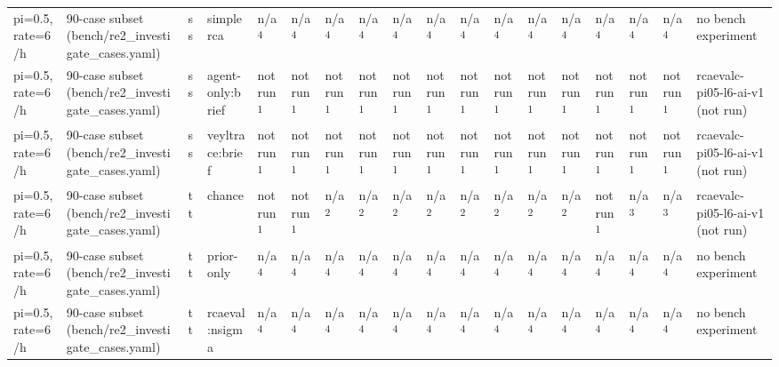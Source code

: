\begin{table}[t]
\begin{tabular}{llllllllllllllllll}
pi=0.5, rate=6/h & 90-case subset (bench/re2\_investigate\_cases.yaml) & ss & simplerca & n/a\textsuperscript{4} & n/a\textsuperscript{4} & n/a\textsuperscript{4} & n/a\textsuperscript{4} & n/a\textsuperscript{4} & n/a\textsuperscript{4} & n/a\textsuperscript{4} & n/a\textsuperscript{4} & n/a\textsuperscript{4} & n/a\textsuperscript{4} & n/a\textsuperscript{4} & n/a\textsuperscript{4} & n/a\textsuperscript{4} & no bench experiment \\
pi=0.5, rate=6/h & 90-case subset (bench/re2\_investigate\_cases.yaml) & ss & agent-only:brief & not run\textsuperscript{1} & not run\textsuperscript{1} & not run\textsuperscript{1} & not run\textsuperscript{1} & not run\textsuperscript{1} & not run\textsuperscript{1} & not run\textsuperscript{1} & not run\textsuperscript{1} & not run\textsuperscript{1} & not run\textsuperscript{1} & not run\textsuperscript{1} & not run\textsuperscript{1} & not run\textsuperscript{1} & rcaevalc-pi05-l6-ai-v1 (not run) \\
pi=0.5, rate=6/h & 90-case subset (bench/re2\_investigate\_cases.yaml) & ss & veyltrace:brief & not run\textsuperscript{1} & not run\textsuperscript{1} & not run\textsuperscript{1} & not run\textsuperscript{1} & not run\textsuperscript{1} & not run\textsuperscript{1} & not run\textsuperscript{1} & not run\textsuperscript{1} & not run\textsuperscript{1} & not run\textsuperscript{1} & not run\textsuperscript{1} & not run\textsuperscript{1} & not run\textsuperscript{1} & rcaevalc-pi05-l6-ai-v1 (not run) \\
pi=0.5, rate=6/h & 90-case subset (bench/re2\_investigate\_cases.yaml) & tt & chance & not run\textsuperscript{1} & not run\textsuperscript{1} & n/a\textsuperscript{2} & n/a\textsuperscript{2} & n/a\textsuperscript{2} & n/a\textsuperscript{2} & n/a\textsuperscript{2} & n/a\textsuperscript{2} & n/a\textsuperscript{2} & n/a\textsuperscript{2} & not run\textsuperscript{1} & n/a\textsuperscript{3} & n/a\textsuperscript{3} & rcaevalc-pi05-l6-ai-v1 (not run) \\
pi=0.5, rate=6/h & 90-case subset (bench/re2\_investigate\_cases.yaml) & tt & prior-only & n/a\textsuperscript{4} & n/a\textsuperscript{4} & n/a\textsuperscript{4} & n/a\textsuperscript{4} & n/a\textsuperscript{4} & n/a\textsuperscript{4} & n/a\textsuperscript{4} & n/a\textsuperscript{4} & n/a\textsuperscript{4} & n/a\textsuperscript{4} & n/a\textsuperscript{4} & n/a\textsuperscript{4} & n/a\textsuperscript{4} & no bench experiment \\
pi=0.5, rate=6/h & 90-case subset (bench/re2\_investigate\_cases.yaml) & tt & rcaeval:nsigma & n/a\textsuperscript{4} & n/a\textsuperscript{4} & n/a\textsuperscript{4} & n/a\textsuperscript{4} & n/a\textsuperscript{4} & n/a\textsuperscript{4} & n/a\textsuperscript{4} & n/a\textsuperscript{4} & n/a\textsuperscript{4} & n/a\textsuperscript{4} & n/a\textsuperscript{4} & n/a\textsuperscript{4} & n/a\textsuperscript{4} & no bench experiment \\

\end{tabular}
\end{table}
